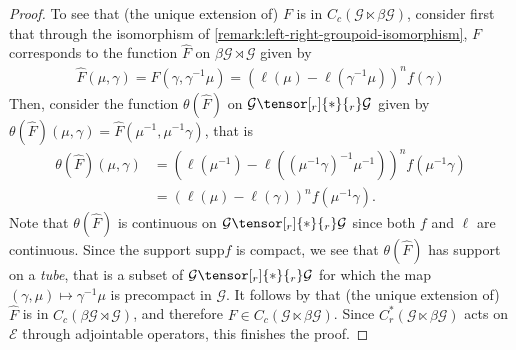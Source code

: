 \documentclass[11pt,a4paper,oneside,final,reqno]{amsart}
\theoremstyle{definition}
\newcommand{\G}{\mathcal{G}}
\newcommand{\E}{\mathcal{E}}
\newcommand{\supp}{\mathrm{supp}}
\newcommand{\Cred}{C_{r}^{*}}
\numberwithin{equation}{section}
\begin{document}
\begin{proof}
		To see that (the unique extension of) $F$ is in 
		$C_c (\G \ltimes \beta \G)$,
		consider first that through the isomorphism of \cref{remark:left-right-groupoid-isomorphism}, $F$ corresponds to the function $\hat{F}$ on $\beta \G \rtimes \G$ given by 
		\begin{align*}
			\hat{F}(\mu, \gamma) = F(\gamma, \gamma^{-1}\mu) = (\ell(\mu) - \ell(\gamma^{-1}\mu))^n f(\gamma) 
		\end{align*}
		Then, consider the function $\theta(\hat{F})$ on $\G \tensor[_r]{*}{_r} \G$ given by $\theta(\hat{F})(\mu, \gamma) = \hat{F}(\mu^{-1}, \mu^{-1}\gamma)$, that is
		\begin{align*}
			\theta(\hat{F})(\mu, \gamma) &= (\ell(\mu^{-1}) - \ell((\mu^{-1}\gamma)^{-1}\mu^{-1}))^n f(\mu^{-1}\gamma)\\
			&= (\ell(\mu) - \ell(\gamma))^n f(\mu^{-1}\gamma).
		\end{align*}
		Note that $\theta(\hat{F})$ is continuous on $\G\tensor[_r]{*}{_r} \G$ since both $f$ and $\ell$ are continuous. 
		Since the support $\supp f$ is compact, we see that $\theta(\hat{F})$ has support on a \emph{tube}, that is a subset of $\G \tensor[_r]{*}{_r} \G$ for which the map $(\gamma, \mu) \mapsto \gamma^{-1}\mu$ is precompact in $\G$.  It follows by \cite[Lemma 6.17]{DelarocheExactGroupoidsV3} that (the unique extension of) $\hat{F}$ is in $C_c (\beta \G \rtimes \G)$, and therefore $F \in C_c (\G \ltimes \beta \G)$. Since $\Cred( \G \ltimes \beta\G)$ acts on $\E$ through adjointable operators, this finishes the proof.   
	\end{proof}
	
\end{document}
